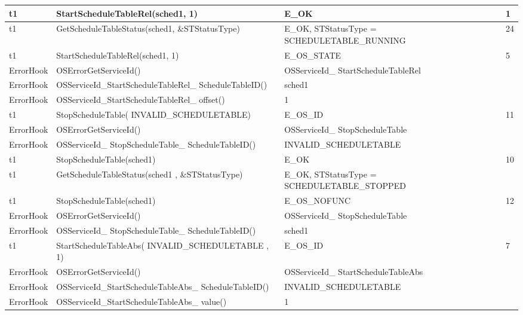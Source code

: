 \documentclass[10pt]{article}
\newlength{\Li}\settowidth{\Li}{Running}
\newlength{\Lii}\setlength{\Lii}{7cm}
\newlength{\Liiii}\setlength{\Liiii}{0.9cm}
\newlength{\Liii}\setlength{\Liii}{\textwidth} \addtolength{\Liii}{-\Li} \addtolength{\Liii}{-\Lii} \addtolength{\Liii}{-\Liiii}
\begin{document}
\begin{supertabular}{|p{\Li}|p{\Lii}|p{\Liii}|p{\Liiii}|}
	t1	& StartScheduleTableRel(sched1, 1)									& E\_OK												& 1 \\ \hline
	t1	& GetScheduleTableStatus(sched1, \&STStatusType)						& E\_OK, STStatusType = SCHEDULETABLE\_RUNNING		& 24 \\ \hline
	t1	& StartScheduleTableRel(sched1, 1)									& E\_OS\_STATE										& 5 \\ \hline
	ErrorHook	& OSErrorGetServiceId()											& OSServiceId\_ StartScheduleTableRel						& \\ \hline
	ErrorHook	& OSServiceId\_StartScheduleTableRel\_ ScheduleTableID()				& sched1												& \\ \hline
	ErrorHook	& OSServiceId\_StartScheduleTableRel\_ offset()						& 1													& \\ \hline
	
	t1	& StopScheduleTable( INVALID\_SCHEDULETABLE)						& E\_OS\_ID											& 11 \\ \hline
	ErrorHook	& OSErrorGetServiceId()											& OSServiceId\_ StopScheduleTable						& \\ \hline
	ErrorHook	& OSServiceId\_ StopScheduleTable\_ ScheduleTableID()				& INVALID\_SCHEDULETABLE							& \\ \hline
	
	t1	& StopScheduleTable(sched1)											& E\_OK												& 10 \\ \hline
	t1	& GetScheduleTableStatus(sched1 , \&STStatusType)						& E\_OK, STStatusType = SCHEDULETABLE\_STOPPED		& \\ \hline
	t1	& StopScheduleTable(sched1)											& E\_OS\_NOFUNC										& 12 \\ \hline
	ErrorHook	& OSErrorGetServiceId()											& OSServiceId\_ StopScheduleTable						& \\ \hline
	ErrorHook	& OSServiceId\_ StopScheduleTable\_ ScheduleTableID()				& sched1												& \\ \hline
	
	t1	& StartScheduleTableAbs( INVALID\_SCHEDULETABLE , 1)					& E\_OS\_ID											& 7 \\ \hline
	ErrorHook	& OSErrorGetServiceId()											& OSServiceId\_ StartScheduleTableAbs						& \\ \hline
	ErrorHook	& OSServiceId\_StartScheduleTableAbs\_ ScheduleTableID()				& INVALID\_SCHEDULETABLE							& \\ \hline
	ErrorHook	& OSServiceId\_StartScheduleTableAbs\_ value()						& 1													& \\ \hline
	

\end{supertabular}
\end{document}
